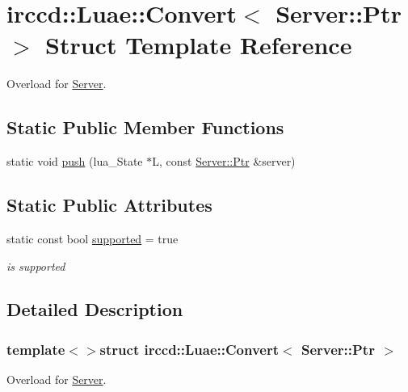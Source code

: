 \hypertarget{a00014}{\section{irccd\-:\-:Luae\-:\-:Convert$<$ Server\-:\-:Ptr $>$ Struct Template Reference}
\label{a00014}
}


Overload for \hyperlink{a00055}{Server}.  


\subsection*{Static Public Member Functions}
\begin{DoxyCompactItemize}
\item 
static void \hyperlink{a00014_a7db307ac2ba06a80a4dfd79f541b0c04}{push} (lua\-\_\-\-State $\ast$L, const \hyperlink{a00055_aea3f9694df81348b909814ac6f84f874}{Server\-::\-Ptr} \&server)
\end{DoxyCompactItemize}
\subsection*{Static Public Attributes}
\begin{DoxyCompactItemize}
\item 
\hypertarget{a00014_ab2eb6484c1f0542ed6086c2c4fab2597}{static const bool \hyperlink{a00014_ab2eb6484c1f0542ed6086c2c4fab2597}{supported} = true}\label{a00014_ab2eb6484c1f0542ed6086c2c4fab2597}

\begin{DoxyCompactList}\small\item\em is supported \end{DoxyCompactList}\end{DoxyCompactItemize}


\subsection{Detailed Description}
\subsubsection*{template$<$$>$struct irccd\-::\-Luae\-::\-Convert$<$ Server\-::\-Ptr $>$}

Overload for \hyperlink{a00055}{Server}. 

